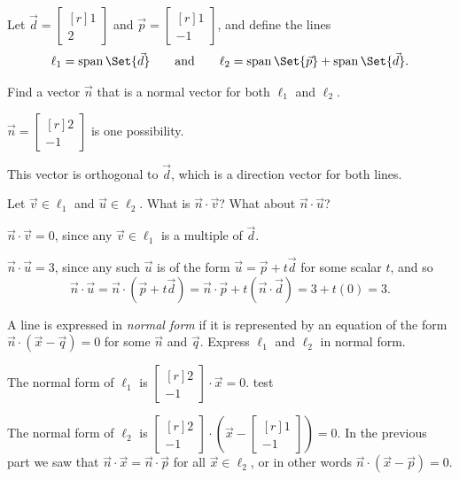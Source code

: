 \documentclass{problemset}
\DeclareMathOperator{\Span}{span}
\newcommand{\mat}[1]{\begin{bmatrix*}[r]#1\end{bmatrix*}}
\begin{document}
	\question
	Let $\vec d=\mat{1\\2}$ and $\vec p=\mat{1\\-1}$, and define the lines
	\[
		\ell_1 = \Span\Set{\vec d}\qquad\text{and}\qquad \ell_2=\Span\Set{\vec p}+\Span\Set{\vec d}.
	\]
	\begin{parts}
		\item Find a vector $\vec n$ that is a normal vector for both $\ell_1$
			and	$\ell_2$.
			\begin{solution}
				$\vec n=\mat{2\\-1}$ is one possibility. 

				This vector is orthogonal to $\vec d$, which is a direction 
				vector for both lines.				
			\end{solution}
		\item Let $\vec v\in \ell_1$ and $\vec u\in \ell_2$. 
			What is $\vec n\cdot \vec v$? What about $\vec n\cdot \vec u$?
			\begin{solution}
				$\vec n\cdot \vec v = 0$, since any $\vec v \in \ell_1$ is a multiple
				of $\vec d$. 

				$\vec n\cdot \vec u=3$, since any such $\vec u$ is of the form 
				$\vec u=\vec p+t\vec d$ for some scalar $t$, and so
				\[
					\vec n\cdot \vec u
					=\vec n\cdot (\vec p+t\vec d)
					=\vec n\cdot \vec p+t(\vec n\cdot \vec d)
					=3+t(0)
					=3.
				\]
			\end{solution}
		\item A line is expressed in \emph{normal form} if it is represented by
			an equation of the form $\vec n\cdot (\vec x-\vec q)=0$ for some 
			$\vec n$ and $\vec q$. Express $\ell_1$ and $\ell_2$ in normal form.
			\begin{solution}
				The normal form of $\ell_1$ is $\mat{2\\-1}\cdot\vec x=0$. test 

				The normal form of $\ell_2$ is $\mat{2\\-1}\cdot\left(\vec x-\mat{1\\-1}\right)=0$.
				In the previous part we saw that $\vec n\cdot \vec x=\vec n\cdot \vec p$
				for all $\vec x\in \ell_2$, or in other words $\vec n\cdot (\vec x-\vec p) = 0$. 
			\end{solution}
	\end{parts}
	
\end{document}
